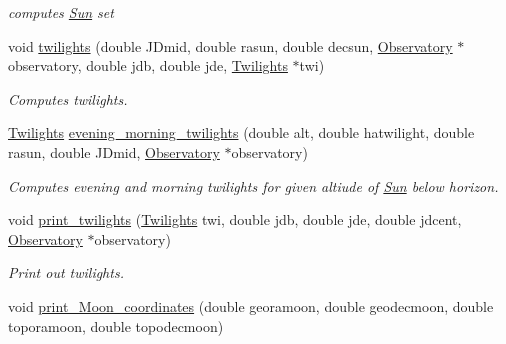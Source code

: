 \begin{DoxyCompactItemize}
\begin{DoxyCompactList}\small\item\em computes \hyperlink{class_sun}{Sun} set \end{DoxyCompactList}\item 
\hypertarget{class_observatory_ae162aeeecbe8da3eb8a79c229e954b40}{void \hyperlink{class_observatory_ae162aeeecbe8da3eb8a79c229e954b40}{twilights} (double J\-Dmid, double rasun, double decsun, \hyperlink{class_observatory}{Observatory} $\ast$observatory, double jdb, double jde, \hyperlink{struct_twilights}{Twilights} $\ast$twi)}\label{class_observatory_ae162aeeecbe8da3eb8a79c229e954b40}

\begin{DoxyCompactList}\small\item\em Computes twilights. \end{DoxyCompactList}\item 
\hypertarget{class_observatory_a432974fb788ea00be435b4f33ffec61b}{\hyperlink{struct_twilights}{Twilights} \hyperlink{class_observatory_a432974fb788ea00be435b4f33ffec61b}{evening\-\_\-morning\-\_\-twilights} (double alt, double hatwilight, double rasun, double J\-Dmid, \hyperlink{class_observatory}{Observatory} $\ast$observatory)}\label{class_observatory_a432974fb788ea00be435b4f33ffec61b}

\begin{DoxyCompactList}\small\item\em Computes evening and morning twilights for given altiude of \hyperlink{class_sun}{Sun} below horizon. \end{DoxyCompactList}\item 
\hypertarget{class_observatory_a8639a25aac7fb0168a034c53e3a7d034}{void \hyperlink{class_observatory_a8639a25aac7fb0168a034c53e3a7d034}{print\-\_\-twilights} (\hyperlink{struct_twilights}{Twilights} twi, double jdb, double jde, double jdcent, \hyperlink{class_observatory}{Observatory} $\ast$observatory)}\label{class_observatory_a8639a25aac7fb0168a034c53e3a7d034}

\begin{DoxyCompactList}\small\item\em Print out twilights. \end{DoxyCompactList}\item 
\hypertarget{class_observatory_ab84b6d65ea6d7c299fa71c1007bcef6f}{void \hyperlink{class_observatory_ab84b6d65ea6d7c299fa71c1007bcef6f}{print\-\_\-\-Moon\-\_\-coordinates} (double georamoon, double geodecmoon, double toporamoon, double topodecmoon)}\label{class_observatory_ab84b6d65ea6d7c299fa71c1007bcef6f}


\end{DoxyCompactItemize}

